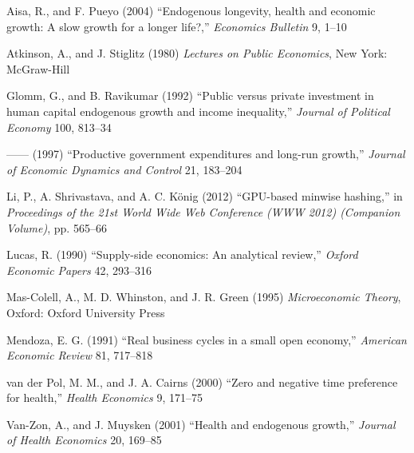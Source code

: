 \documentclass{cje}          %
\theoremstyle{plain}%
\theoremstyle{definition}
\theoremstyle{remark}
\begin{document}
\begin{smallverbatim}
\begin{thebibliography}{10}
\newcommand{\enquote}[1]{``#1''}

Aisa, R., and F. Pueyo (2004) \enquote{Endogenous longevity, health and
  economic growth: A slow growth for a longer life?,} \emph{Economics 
  Bulletin} 9, 1--10

Atkinson, A., and J. Stiglitz (1980) \emph{Lectures on Public Economics}, 
  New York: McGraw-Hill

Glomm, G., and B. Ravikumar (1992) \enquote{Public versus private 
  investment in human capital endogenous growth and income inequality,} 
  \emph{Journal of Political Economy} 100, 813--34

------ (1997) \enquote{Productive government expenditures and long-run 
  growth,} \emph{Journal of Economic Dynamics and Control} 21, 183--204

Li, P., A. Shrivastava, and A. C. K{\"o}nig (2012) \enquote{{GPU}-based 
  minwise hashing,} in \emph{Proceedings of the 21st World Wide Web 
  Conference (WWW 2012) (Companion Volume)}, pp. 565--66

Lucas, R. (1990) \enquote{Supply-side economics: An analytical review,}
  \emph{Oxford Economic Papers} 42, 293--316

Mas-Colell, A., M. D. Whinston, and J. R. Green (1995) \emph{Microeconomic
  Theory}, Oxford: Oxford University Press

Mendoza, E. G. (1991) \enquote{Real business cycles in a small open economy,}
  \emph{American Economic Review} 81, 717--818

van der Pol, M. M., and J. A. Cairns (2000) \enquote{Zero and negative time
  preference for health,} \emph{Health Economics} 9, 171--75

Van-Zon, A., and J. Muysken (2001) \enquote{Health and endogenous growth,}
  \emph{Journal of Health Economics} 20, 169--85

\end{thebibliography}
\end{smallverbatim}
\end{document}
